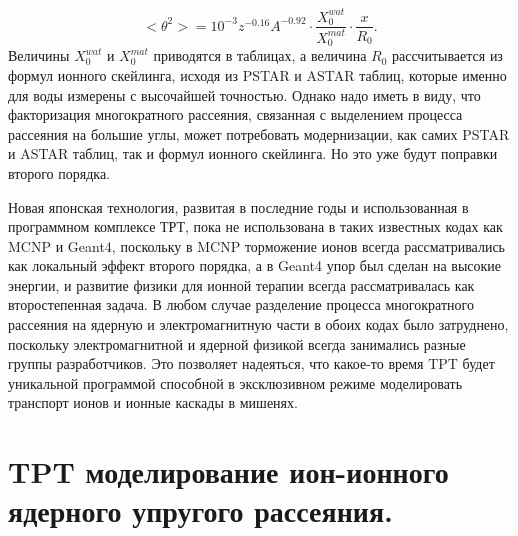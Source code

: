 \documentclass[a4paper,12pt]{article}
\begin{document}
\begin{large}
  \begin{equation}
  \label{KaneTPT}
  <\theta^2>=10^{-3}z^{-0.16}A^{-0.92}\cdot\frac{X_0^{wat}}{X_0^{mat}}\cdot \frac{x}{R_0}.
  \end{equation}
  Величины $X_0^{wat}$ и $X_0^{mat}$ приводятся в таблицах, а величина $R_0$ рассчитывается из формул ионного скейлинга, исходя из PSTAR и ASTAR таблиц, которые именно для воды измерены с высочайшей точностью.
  Однако надо иметь в виду, что факторизация многократного рассеяния, связанная с выделением процесса рассеяния на большие углы, может потребовать модернизации, как самих PSTAR и ASTAR таблиц, так и формул ионного скейлинга.
  Но это уже будут поправки второго порядка.

  Новая японская технология, развитая в последние годы и использованная в программном комплексе ТРТ, пока не использована в таких известных кодах как MCNP и Geant4, поскольку в MCNP торможение ионов всегда рассматривались как локальный эффект второго порядка, а в Geant4 упор был сделан на высокие энергии, и развитие физики для ионной терапии всегда рассматривалась как второстепенная задача.
  В любом случае разделение процесса многократного рассеяния на ядерную и электромагнитную части в обоих кодах было затруднено, поскольку электромагнитной и ядерной физикой всегда занимались разные группы разработчиков.
  Это позволяет надеяться, что какое-то время TPT будет уникальной программой способной в эксклюзивном режиме моделировать транспорт ионов и ионные каскады в мишенях.

\clearpage
\section{TPT моделирование ион-ионного ядерного упругого рассеяния.}
\label{Pol}


\end{large}
\end{document}
